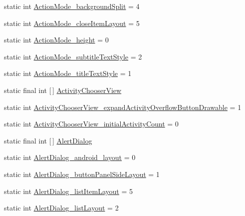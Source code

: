 \begin{DoxyCompactItemize}
\item 
static int \hyperlink{classandroid_1_1support_1_1v7_1_1appcompat_1_1R_1_1styleable_a846fc9b3ed73107bff2246293ce7763e}{Action\+Mode\+\_\+background\+Split} = 4
\item 
static int \hyperlink{classandroid_1_1support_1_1v7_1_1appcompat_1_1R_1_1styleable_a0488491d4fd5b6f8773b484815cbebce}{Action\+Mode\+\_\+close\+Item\+Layout} = 5
\item 
static int \hyperlink{classandroid_1_1support_1_1v7_1_1appcompat_1_1R_1_1styleable_af4cb45abc591ba3b7f173f869cb69cd7}{Action\+Mode\+\_\+height} = 0
\item 
static int \hyperlink{classandroid_1_1support_1_1v7_1_1appcompat_1_1R_1_1styleable_a79b250cbfc7600ab0f0291cc59dc7bbd}{Action\+Mode\+\_\+subtitle\+Text\+Style} = 2
\item 
static int \hyperlink{classandroid_1_1support_1_1v7_1_1appcompat_1_1R_1_1styleable_a7c9fa645d0ba6eaae582d3bb1706309a}{Action\+Mode\+\_\+title\+Text\+Style} = 1
\item 
static final int \mbox{[}$\,$\mbox{]} \hyperlink{classandroid_1_1support_1_1v7_1_1appcompat_1_1R_1_1styleable_a982c115fab0715899d54b7816a21cc47}{Activity\+Chooser\+View}
\item 
static int \hyperlink{classandroid_1_1support_1_1v7_1_1appcompat_1_1R_1_1styleable_a42b0a0f293b2f899ebe89cd182dca36f}{Activity\+Chooser\+View\+\_\+expand\+Activity\+Overflow\+Button\+Drawable} = 1
\item 
static int \hyperlink{classandroid_1_1support_1_1v7_1_1appcompat_1_1R_1_1styleable_ab6826b784285f4584f4c664422674559}{Activity\+Chooser\+View\+\_\+initial\+Activity\+Count} = 0
\item 
static final int \mbox{[}$\,$\mbox{]} \hyperlink{classandroid_1_1support_1_1v7_1_1appcompat_1_1R_1_1styleable_a52dcd4f818920ef336f5b8033a2b34c1}{Alert\+Dialog}
\item 
static int \hyperlink{classandroid_1_1support_1_1v7_1_1appcompat_1_1R_1_1styleable_a0a813a36efb918f7b9c367c3de19bf8a}{Alert\+Dialog\+\_\+android\+\_\+layout} = 0
\item 
static int \hyperlink{classandroid_1_1support_1_1v7_1_1appcompat_1_1R_1_1styleable_ad40086bf4aa954bd7f5c4091ac88c6b1}{Alert\+Dialog\+\_\+button\+Panel\+Side\+Layout} = 1
\item 
static int \hyperlink{classandroid_1_1support_1_1v7_1_1appcompat_1_1R_1_1styleable_a820f56d87f31d7e978af0b5226344187}{Alert\+Dialog\+\_\+list\+Item\+Layout} = 5
\item 
static int \hyperlink{classandroid_1_1support_1_1v7_1_1appcompat_1_1R_1_1styleable_aa5c481cf70cb3310020d7176925aa99c}{Alert\+Dialog\+\_\+list\+Layout} = 2

\end{DoxyCompactItemize}
